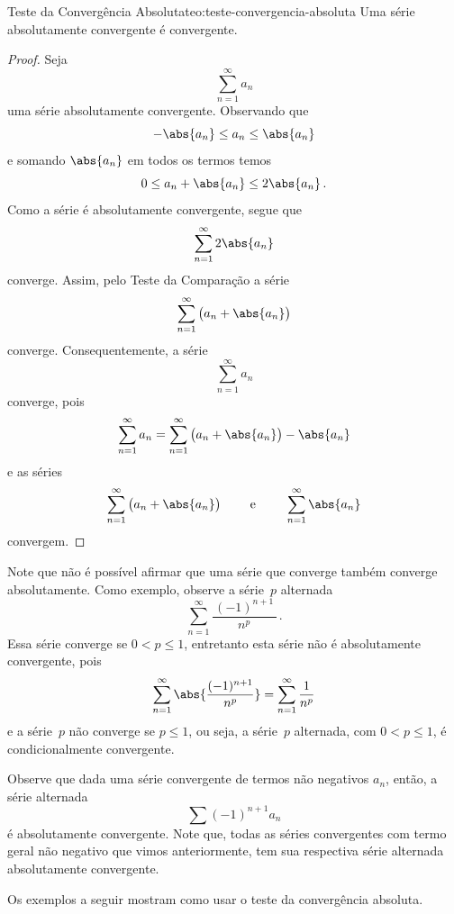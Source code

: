 \begin{teorema}{Teste da Convergência Absoluta}{teo:teste-convergencia-absoluta}
  Uma
  série absolutamente convergente é convergente.
\end{teorema}
\begin{proof}
  Seja
  \[
    \sum_{n=1}^\infty a_n
  \]
  uma série absolutamente convergente. Observando que
  \[
    -\abs{a_n} \leq a_n \leq \abs{a_n}
  \]
  e somando $\abs{a_n}$ em todos os termos temos
  \[
    0 \leq a_n + \abs{a_n} \leq 2\abs{a_n}    \,.
  \]
  Como a série é absolutamente convergente, segue que
  \[
    \sum_{n=1}^\infty 2\abs{a_n}
  \]
  converge.
  Assim, pelo Teste da Comparação a série
  \[
    \sum_{n=1}^\infty \big( a_n + \abs{a_n} \big)
  \]
  converge.
  Consequentemente, a série
  \[
    \sum_{n=1}^\infty a_n
  \]
  converge, pois
  \[
    \sum_{n=1}^\infty a_n = \sum_{n=1}^\infty \big( a_n + \abs{a_n} \big) - \abs{a_n}
  \]
  e as séries
  \[
    \sum_{n=1}^\infty \big( a_n + \abs{a_n} \big)
    \qquad\text{ e }\qquad
    \sum_{n=1}^\infty \abs{a_n}
  \]
  convergem.
\end{proof}

Note que não é possível afirmar que uma série que converge também converge
absolutamente. Como exemplo, observe a série~$p$ alternada
\[
  \sum_{n=1}^\infty \frac{\,(-1)^{n+1}\,}{n^p}       \,.
\]
Essa série converge se $0<p\leq 1$,
entretanto esta série não é absolutamente convergente, pois
\[
  \sum_{n=1}^\infty \abs{\frac{(-1)^{n+1}}{n^p}} = \sum_{n=1}^\infty \frac{1}{n^p}
\]
e a série~$p$ não converge se $p\leq 1$,
ou seja, a série~$p$ alternada, com $0<p\leq 1$, é condicionalmente convergente.

Observe que dada uma série convergente de termos não negativos $a_n$, então,
a série alternada
\[
  \sum (-1)^{n+1}a_n
\]
é absolutamente convergente.
Note que, todas as séries convergentes com termo geral não negativo que vimos
anteriormente, tem sua respectiva série alternada absolutamente convergente.

Os exemplos a seguir mostram como usar o teste da convergência absoluta.

